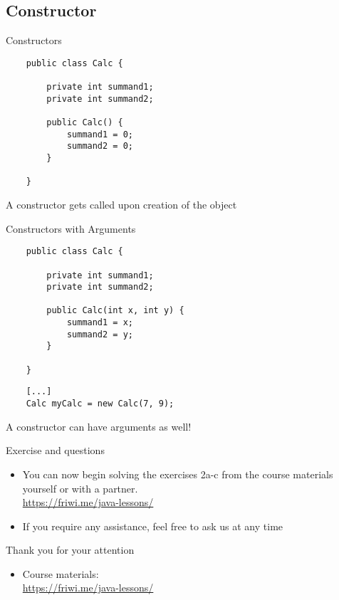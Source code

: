 \subsection{Constructor}

\begin{frame}[fragile]{Constructors}
    \begin{lstlisting}
    public class Calc {
    
        private int summand1;
        private int summand2;
    
        public Calc() {
            summand1 = 0;
            summand2 = 0;
        }
        
    } \end{lstlisting}
    A constructor gets called upon creation of the object
\end{frame}

\begin{frame}[fragile]{Constructors with Arguments}
    \begin{lstlisting}
    public class Calc {
    
        private int summand1;
        private int summand2;
    
        public Calc(int x, int y) {
            summand1 = x;
            summand2 = y;
        }
        
    } \end{lstlisting}
    \begin{lstlisting}
    [...]
    Calc myCalc = new Calc(7, 9); \end{lstlisting}
    
    A constructor can have arguments as well!
\end{frame}

\begin{frame}[fragile]{Exercise and questions}
    \begin{itemize}
    \item You can now begin solving the exercises 2a-c from the course materials yourself or with a partner. \\
        \url{https://friwi.me/java-lessons/}
    \item If you require any assistance, feel free to ask us at any time
    \end{itemize}
\end{frame}

\begin{frame}[fragile]{Thank you for your attention}
    \begin{itemize}
    \item Course materials: \\
        \url{https://friwi.me/java-lessons/}
    \end{itemize}
\end{frame}


